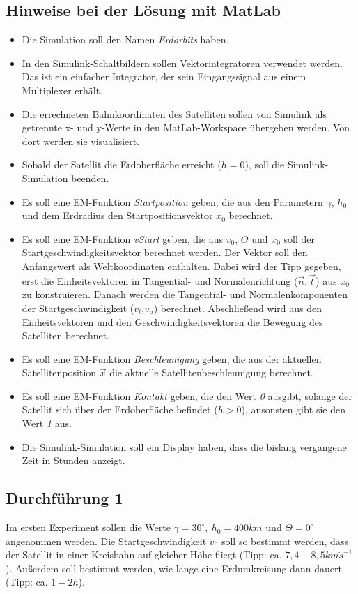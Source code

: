 \documentclass[]{scrartcl}
\begin{document}
\subsection{Hinweise bei der Lösung mit MatLab}
\begin{itemize}
\item Die Simulation soll den Namen \textit{Erdorbits} haben.
\item In den Simulink-Schaltbildern sollen Vektorintegratoren verwendet werden. Das ist ein einfacher Integrator, der sein Eingangssignal aus einem Multiplexer erhält.
\item Die errechneten Bahnkoordinaten des Satelliten sollen von Simulink als getrennte x- und y-Werte in den MatLab-Workspace übergeben werden. Von dort werden sie visualisiert.
\item Sobald der Satellit die Erdoberfläche erreicht ($h=0$), soll die Simulink-Simulation beenden.
\item Es soll eine EM-Funktion \textit{Startposition} geben, die aus den Parametern $\gamma$, $h_{0}$ und dem Erdradius den Startpositionsvektor $x_{0}$ berechnet.
\item Es soll eine EM-Funktion \textit{vStart} geben, die aus $v_{0}$, $\Theta$ und $x_{0}$ soll der Startgeschwindigkeitsvektor berechnet werden. Der Vektor soll den Anfangswert als Weltkoordinaten enthalten. Dabei wird der Tipp gegeben, erst die Einheitsvektoren in Tangential- und Normalenrichtung ($\vec{n},\vec{t}$) aus $x_{0}$ zu konstruieren. Danach werden die Tangential- und Normalenkomponenten der Startgeschwindigkeit ($v_{t}$,$v_{n}$) berechnet. Abschließend wird aus den Einheitsvektoren und den Geschwindigkeitsvektoren die Bewegung des Satelliten berechnet.
\item Es soll eine EM-Funktion \textit{Beschleunigung} geben, die aus der aktuellen Satellitenposition $\vec{x}$ die aktuelle Satellitenbeschleunigung berechnet.
\item Es soll eine EM-Funktion \textit{Kontakt} geben, die den Wert \textit{0} ausgibt, solange der Satellit sich über der Erdoberfläche befindet ($h > 0$), ansonsten gibt sie den Wert \textit{1} aus.
\item Die Simulink-Simulation soll ein Display haben, dass die bislang vergangene Zeit in Stunden anzeigt.
\end{itemize}

\subsection{Durchführung 1}
Im ersten Experiment sollen die Werte $\gamma = 30^\circ,\ h_{0} = 400km$ und $\Theta=0^\circ$ angenommen werden. Die Startgeschwindigkeit $v_{0}$ soll so bestimmt werden, dass der Satellit in einer Kreisbahn auf gleicher Höhe fliegt (Tipp: ca. $7,4 - 8,5 km \dot s^{-1}$). Außerdem soll bestimmt werden, wie lange eine Erdumkreisung dann dauert (Tipp: ca. $1 - 2h$).
\end{document}
